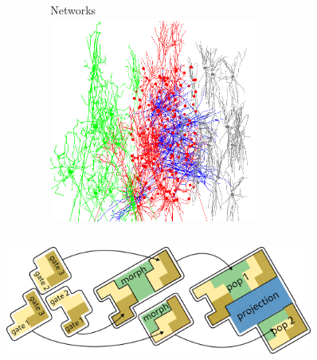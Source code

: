 \begin{frame}[c]
\begin{columns}
\begin{column}{0.3\textwidth}
\begin{figure}[h]
      \end{figure}%
    \end{column}
    \begin{column}{0.3\textwidth}
      \begin{figure}[h]
        \centering
        Networks\\
        \includegraphics[width=0.7\textwidth]{99_images/20231004-HL23Net}\\\vspace{0.2cm}
      \end{figure}%
    \end{column}
  \end{columns}
  \begin{figure}[h]
    \centering
    \includegraphics[width=0.9\textwidth]{99_images/lego}
  \end{figure}%
\end{frame}
